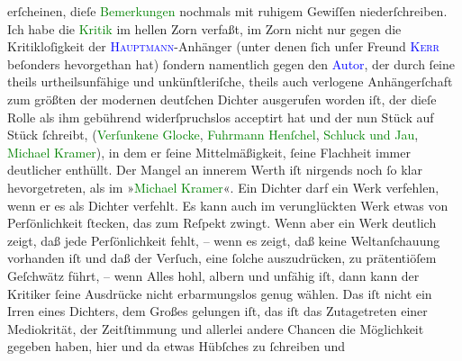                erſcheinen, dieſe \textcolor{green}{Bemerkungen}{}\ledrightnote{{$\rightarrow$}\textcolor{green}{Feuilleton. »Michael Kramer.«}}
               nochmals mit ruhigem Gewiſſen niederſchreiben. Ich habe die \textcolor{green}{Kritik}{}\ledrightnote{{$\rightarrow$}\textcolor{green}{Feuilleton. »Michael Kramer.«}} im hellen Zorn verfaßt, im Zorn
               nicht nur gegen die Kritikloſigkeit der \textsc{\textcolor{blue}{Hauptmann}{}\ledrightnote{\textcolor{blue}{Gerhart Hauptmann}}}-Anhänger (unter denen ſich unſer Freund \textsc{\textcolor{blue}{Kerr}{}\ledrightnote{\textcolor{blue}{Alfred Kerr}}} beſonders hevorgethan hat) ſondern namentlich gegen den \textcolor{blue}{Autor}{}\ledrightnote{{$\rightarrow$}\textcolor{blue}{Gerhart Hauptmann}}, der durch ſeine theils
               urtheilsunfähige und unkünſtleriſche, theils auch verlogene Anhängerſchaft {\pb}zum größten der modernen deutſchen Dichter
               ausgerufen worden iſt, der dieſe Rolle als ihm gebührend widerſpruchslos acceptirt
               hat und der nun Stück auf Stück ſchreibt,  (\textcolor{green}{Verſunkene Glocke}{}\ledrightnote{\textcolor{green}{Die versunkene Glocke}}, \textcolor{green}{Fuhrmann Henſchel}{}\ledrightnote{\textcolor{green}{Fuhrmann Henschel}}, \textcolor{green}{Schluck
                  und Jau}{}\ledrightnote{\textcolor{green}{Schluck und Jau}}, \textcolor{green}{Michael Kramer}{}\ledrightnote{\textcolor{green}{Michael Kramer}}), in dem er
               ſeine Mittelmäßigkeit, ſeine Flachheit immer deutlicher enthüllt. Der Mangel an
               innerem Werth iſt nirgends noch ſo klar hevorgetreten, als im »\textcolor{green}{Michael Kramer}{}\ledrightnote{\textcolor{green}{Michael Kramer}}«. Ein Dichter darf ein Werk verfehlen, wenn er
               es als Dichter verfehlt. Es kann auch im verunglückten Werk  etwas von Perſönlichkeit ſtecken, das zum Reſpekt zwingt. {\pb}Wenn aber ein Werk deutlich zeigt, daß jede
               Perſönlichkeit fehlt, – wenn es zeigt, daß keine Weltanſchauung vorhanden iſt und daß
               der Verſuch, eine ſolche auszudrücken, zu  prätentiöſem Geſchwätz führt, – wenn Alles hohl, albern und unfähig iſt, dann
               kann der Kritiker ſeine Ausdrücke nicht erbarmungslos genug  wählen. Das iſt nicht ein Irren eines Dichters, dem Großes gelungen
               iſt, das iſt das Zutagetreten einer Mediokrität, der Zeitſtimmung und allerlei andere
               Chancen die Möglichkeit gegeben haben, hier und da etwas Hübſches zu ſchreiben und
